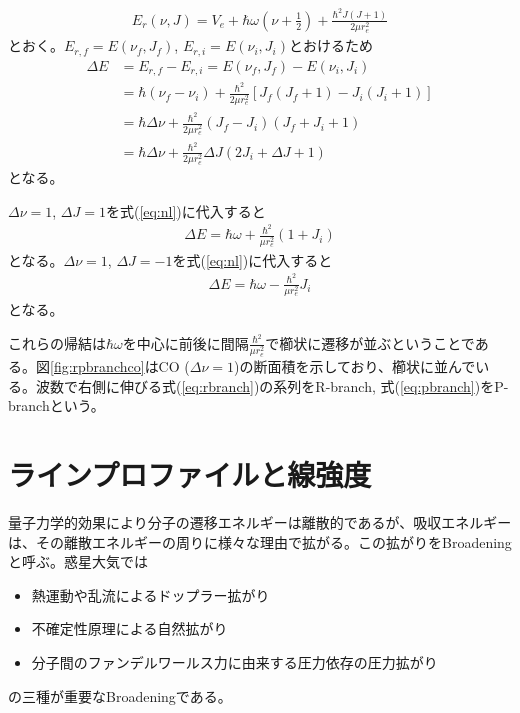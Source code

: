 \begin{align}
E_r(\nu,J) = V_e + \hbar \omega \left( \nu + \frac{1}{2} \right) + \frac{\hbar^2 J(J+1)}{2 \mu r_e^2}
\end{align}
とおく。$E_{r,f} = E(\nu_f, J_f)$, $E_{r,i}=E(\nu_i,J_i)$とおけるため
\begin{align}
  \Delta E &= E_{r,f} - E_{r,i} = E(\nu_f, J_f) - E(\nu_i,J_i) \\
  &= \hbar (\nu_f -\nu_i) + \frac{\hbar^2}{2 \mu r_e^2} [J_f(J_f+1) - J_i(J_i+1)] \\
  &= \hbar \Delta \nu + \frac{\hbar^2}{2 \mu r_e^2} (J_f-J_i)(J_f + J_i + 1) \\
  \label{eq:nl}
  &= \hbar \Delta \nu + \frac{\hbar^2}{2 \mu r_e^2} \Delta J (2 J_i + \Delta J + 1)
\end{align}
となる。


$\Delta \nu = 1$, $\Delta J = 1$を式(\ref{eq:nl})に代入すると
\begin{align}
\label{eq:rbranch}
\Delta E = \hbar \omega + \frac{\hbar^2}{\mu r_e^2} (1 + J_i)
\end{align}
となる。$\Delta \nu = 1$, $\Delta J = -1$を式(\ref{eq:nl})に代入すると
\begin{align}
\label{eq:pbranch}
\Delta E = \hbar \omega - \frac{\hbar^2}{\mu r_e^2} J_i
\end{align}
となる。

これらの帰結は$\hbar \omega$を中心に前後に間隔$\frac{\hbar^2}{\mu r_e^2}$で櫛状に遷移が並ぶということである。図\ref{fig:rpbranchco}はCO ($\Delta \nu =1$)の断面積を示しており、櫛状に並んでいる。波数で右側に伸びる式(\ref{eq:rbranch})の系列をR-branch, 式(\ref{eq:pbranch})をP-branchという。


\section{ラインプロファイルと線強度}

量子力学的効果により分子の遷移エネルギーは離散的であるが、吸収エネルギーは、その離散エネルギーの周りに様々な理由で拡がる。この拡がりをBroadeningと呼ぶ。惑星大気では
\begin{itemize}
    \item 熱運動や乱流によるドップラー拡がり
    \item 不確定性原理による自然拡がり
    \item 分子間のファンデルワールス力に由来する圧力依存の圧力拡がり
\end{itemize}
の三種が重要なBroadeningである。

